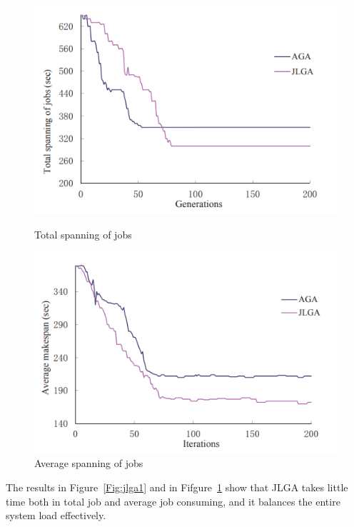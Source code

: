 \begin{figure}[!htb]
    \begin{minipage}{0.48\textwidth}
      \centering
      \includegraphics[width=1\textwidth]{Resources/litreview/MAGA/aga_vs_jlga_2.png}
      \caption{Total spanning of jobs}\label{Fig:jlga1}
    \end{minipage}\hfill
    \begin{minipage}{0.48\textwidth}
      \centering
      \includegraphics[width=1\textwidth]{Resources/litreview/MAGA/aga_vs_jlga_1.png}
      \caption{Average spanning of jobs}\label{Fig:jlga2}
    \end{minipage}
 \end{figure}


The results in Figure~\ref{Fig:jlga1} and in Fifgure~\ref{Fig:jlga2} show that JLGA takes little time both in total job and average job consuming, 
and it balances the entire system load effectively.

